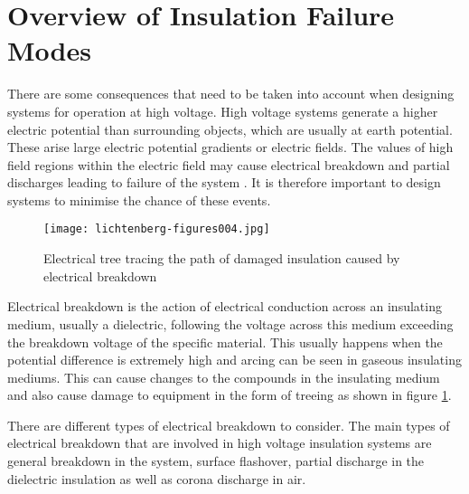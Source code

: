 \section{Overview of Insulation Failure Modes}
There are some consequences that need to be taken into account when designing systems for operation at high voltage. 
High voltage systems generate a higher electric potential than surrounding objects, which are usually at earth potential. 
These arise large electric potential gradients or electric fields. 
The values of high field regions within the electric field may cause electrical breakdown and partial discharges leading to failure of the system \citep{kuffel2000high}. 
It is therefore important to design systems to minimise the chance of these events.

\begin{figure}[!h]
   \centering
   \texttt{[image: lichtenberg-figures004.jpg]}
   \caption{Electrical tree tracing the path of damaged insulation caused by electrical breakdown}
   \label{figure:breakdown}
\end{figure}

Electrical breakdown is the action of electrical conduction across an insulating medium, usually a dielectric, following the voltage across this medium exceeding the breakdown voltage of the specific material. 
This usually happens when the potential difference is extremely high and arcing can be seen in gaseous insulating mediums. 
This can cause changes to the compounds in the insulating medium and also cause damage to equipment in the form of treeing as shown in figure \ref{figure:breakdown}. 

There are different types of electrical breakdown to consider. 
The main types of electrical breakdown that are involved in high voltage insulation systems are general breakdown in the system, surface flashover, partial discharge in the dielectric insulation as well as corona discharge in air.

